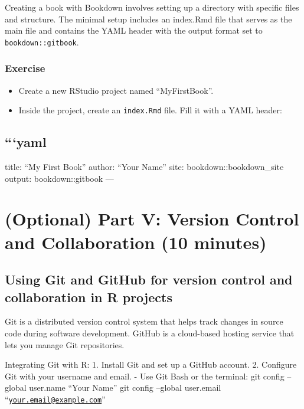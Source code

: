 \documentclass[
]{book}
\providecommand{\tightlist}{%
  \setlength{\itemsep}{0pt}\setlength{\parskip}{0pt}}
\begin{document}
Creating a book with Bookdown involves setting up a directory with specific files and structure. The minimal setup includes an index.Rmd file that serves as the main file and contains the YAML header with the output format set to \texttt{bookdown::gitbook}.

\subsection*{Exercise}\label{exercise-16}

\begin{itemize}
\tightlist
\item
  Create a new RStudio project named ``MyFirstBook''.
\item
  Inside the project, create an \texttt{index.Rmd} file. Fill it with a YAML header:
\end{itemize}

\section{```yaml}\label{yaml}

title: ``My First Book''
author: ``Your Name''
site: bookdown::bookdown\_site
output: bookdown::gitbook
---

\chapter*{(Optional) Part V: Version Control and Collaboration (10 minutes)}\label{optional-part-v-version-control-and-collaboration-10-minutes}

\section*{Using Git and GitHub for version control and collaboration in R projects}\label{using-git-and-github-for-version-control-and-collaboration-in-r-projects}

Git is a distributed version control system that helps track changes in source code during software development. GitHub is a cloud-based hosting service that lets you manage Git repositories.

Integrating Git with R:
1. Install Git and set up a GitHub account.
2. Configure Git with your username and email.
- Use Git Bash or the terminal:
git config --global user.name ``Your Name''
git config --global user.email ``\href{mailto:your.email@example.com}{\nolinkurl{your.email@example.com}}''
\end{document}
